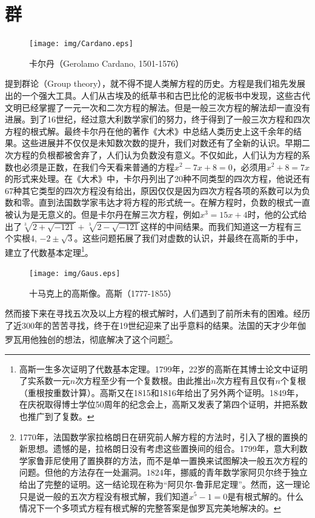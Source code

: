 \documentclass{article}
\begin{document}
\section{群}

\begin{figure}
 \centering
 \texttt{[image: img/Cardano.eps]}
 \captionsetup{labelformat=empty}
 \caption{卡尔丹（Gerolamo Cardano, 1501-1576）}
 \label{fig:Cardano}
\end{figure}

提到群论（Group theory），就不得不提人类解方程的历史。方程是我们祖先发展出的一个强大工具。人们从古埃及的纸草书和古巴比伦的泥板书中发现，这些古代文明已经掌握了一元一次和二次方程的解法。但是一般三次方程的解法却一直没有进展。到了16世纪，经过意大利数学家们的努力，终于得到了一般三次方程和四次方程的根式解。最终卡尔丹在他的著作《大术》中总结人类历史上这千余年的结果。这些进展并不仅仅是未知数次数的提升，我们对数还有了全新的认识。早期二次方程的负根都被舍弃了，人们认为负数没有意义。不仅如此，人们认为方程的系数也必须是正数，在我们今天看来普通的方程$x^2 - 7x + 8 = 0$，必须用$x^2 + 8 = 7x$的形式来处理。在《大术》中，卡尔丹列出了20种不同类型的四次方程，他说还有67种其它类型的四次方程没有给出，原因仅仅是因为四次方程各项的系数可以为负数和零\cite{HanXueTao2012}。直到法国数学家韦达才将方程的形式统一。在解方程时，负数的根式一直被认为是无意义的。但是卡尔丹在解三次方程，例如$x^3 = 15x +4$时，他的公式给出了$\sqrt[3]{2 + \sqrt{-121}} + \sqrt[3]{2 - \sqrt{-121}}$这样的中间结果。而我们知道这一方程有三个实根4, $-2 \pm \sqrt{3}$。这些问题拓展了我们对虚数的认识，并最终在高斯的手中，建立了代数基本定理\footnote{高斯一生多次证明了代数基本定理。1799年，22岁的高斯在其博士论文中证明了实系数一元$n$次方程至少有一个复数根。由此推出$n$次方程有且仅有$n$个复根（重根按重数计算）。高斯又在1815和1816年给出了另外两个证明。1849年，在庆祝取得博士学位50周年的纪念会上，高斯又发表了第四个证明，并把系数也推广到了复数。}。

\begin{figure}[htbp]
 \centering
 \texttt{[image: img/Gaus.eps]}
 \captionsetup{labelformat=empty}
 \caption{十马克上的高斯像。高斯（1777-1855）}
 \label{fig:Gauss}
\end{figure}

然而接下来在寻找五次及以上方程的根式解时，人们遇到了前所未有的困难。经历了近300年的苦苦寻找，终于在19世纪迎来了出乎意料的结果。法国的天才少年伽罗瓦用他独创的想法，彻底解决了这个问题\footnote{1770年，法国数学家拉格朗日在研究前人解方程的方法时，引入了根的置换的新思想。遗憾的是，拉格朗日没有考虑这些置换间的组合。1799年，意大利数学家鲁菲尼使用了置换群的方法，而不是单一置换来试图解决一般五次方程的问题。但他的方法存在一处漏洞。1824年，挪威的青年数学家阿贝尔终于独立给出了完整的证明。这一结论现在称为“阿贝尔-鲁菲尼定理”。然而，这一理论只是说一般的五次方程没有根式解，我们知道$x^5-1=0$是有根式解的。什么情况下一个多项式方程有根式解的完整答案是伽罗瓦完美地解决的\cite{Wiki-Galois-theory}。}。
\end{document}
